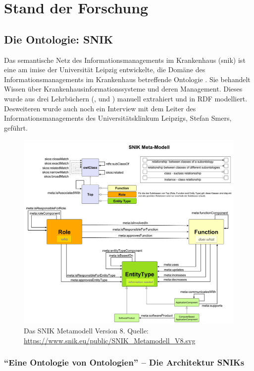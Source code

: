 \chapter{Stand der Forschung}\label{ch:relatedWork}

\section{Die Ontologie: SNIK}\label{sec:snik}

Das semantische Netz des Informationsmanagements im Krankenhaus (\ac{snik}) ist eine am \ac{imise} der Universität Leipzig entwickelte,
die Domäne des Informationsmanagements im Krankenhaus betreffende Ontologie \citep{domaene}.
Sie behandelt Wissen über Krankenhausinformationssysteme und deren Management.
Dieses wurde aus drei Lehrbüchern (\citet{bb}, \citet{ob} und \citet{he}) manuell extrahiert und in RDF modelliert.
Desweiteren wurde auch noch ein Interview mit dem Leiter des Informationsmanagements des Universitätsklinkum Leipzigs, Stefan Smers, geführt.

\begin{figure}
\centering
\includegraphics[width=.8\textwidth, height=.9\textheight, keepaspectratio]{Images/snik-metamodel.pdf}
\caption[SNIK Metamodell Version 8]{Das SNIK Metamodell Version 8. Quelle: \url{https://www.snik.eu/public/SNIK_Metamodell_V8.svg}}
\label{fig:snik-metamodel}
\end{figure}

\subsection[Die Architektur SNIKs]{\enquote{Eine Ontologie von Ontologien} -- Die Architektur SNIKs}

